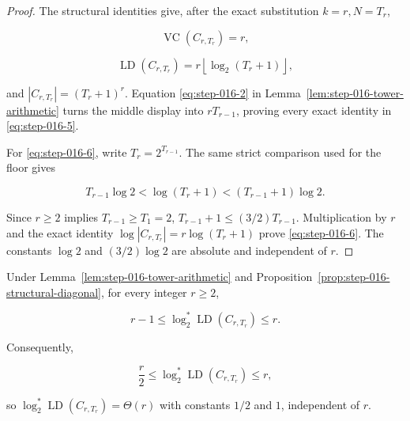 \begin{proof}
The structural identities give, after the exact substitution
\(k=r,N=T_r\),

\[
\operatorname{VC}(C_{r,T_r})=r,
\]

\[
\operatorname{LD}(C_{r,T_r})
=r\left\lfloor\log_2(T_r+1)\right\rfloor,
\]

and \(|C_{r,T_r}|=(T_r+1)^r\). Equation \eqref{eq:step-016-2} in
Lemma~\ref{lem:step-016-tower-arithmetic} turns the middle display into
\(rT_{r-1}\), proving every exact identity in \eqref{eq:step-016-5}.

For \eqref{eq:step-016-6}, write \(T_r=2^{T_{r-1}}\). The same strict comparison used for
the floor gives

\[
T_{r-1}\log2
  <\log(T_r+1)
  <(T_{r-1}+1)\log2.
\]

Since \(r\ge2\) implies \(T_{r-1}\ge T_1=2\),
\(T_{r-1}+1\le(3/2)T_{r-1}\). Multiplication by \(r\) and the exact
identity \(\log|C_{r,T_r}|=r\log(T_r+1)\) prove \eqref{eq:step-016-6}. The constants
\(\log2\) and \((3/2)\log2\) are absolute and independent of \(r\).
\end{proof}

\begin{lemma}\label{lem:step-016-ld-logstar}
Under Lemma~\ref{lem:step-016-tower-arithmetic} and
Proposition~\ref{prop:step-016-structural-diagonal}, for every integer
\(r\ge2\),

\[
r-1
\le
\log_2^*\operatorname{LD}(C_{r,T_r})
\le r.
\tag{S16.7}\label{eq:step-016-7}
\]

Consequently,

\[
\frac r2
\le
\log_2^*\operatorname{LD}(C_{r,T_r})
\le r,
\tag{S16.8}\label{eq:step-016-8}
\]

so \(\log_2^*\operatorname{LD}(C_{r,T_r})=\Theta(r)\) with constants
\(1/2\) and \(1\), independent of \(r\).
\end{lemma}

